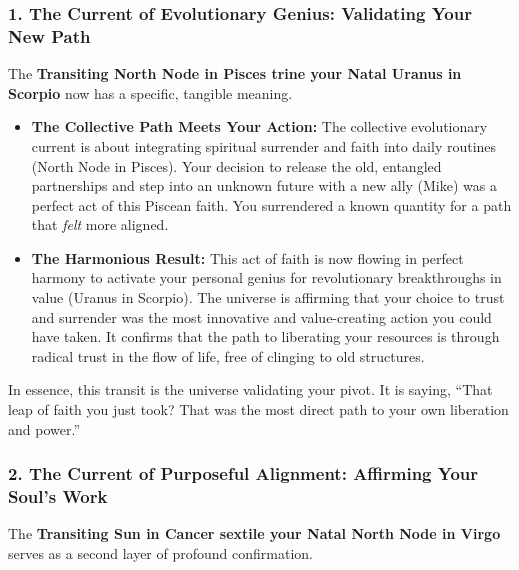 \documentclass{article}
\begin{document}
\subsubsection*{1. The Current of Evolutionary Genius: Validating Your
New
Path}\label{the-current-of-evolutionary-genius-validating-your-new-path}

The \textbf{Transiting North Node in Pisces trine your Natal Uranus in
Scorpio} now has a specific, tangible meaning.

\begin{itemize}
\item
  \textbf{The Collective Path Meets Your Action:} The collective
  evolutionary current is about integrating spiritual surrender and
  faith into daily routines (North Node in Pisces). Your decision to
  release the old, entangled partnerships and step into an unknown
  future with a new ally (Mike) was a perfect act of this Piscean faith.
  You surrendered a known quantity for a path that \emph{felt} more
  aligned.
\item
  \textbf{The Harmonious Result:} This act of faith is now flowing in
  perfect harmony to activate your personal genius for revolutionary
  breakthroughs in value (Uranus in Scorpio). The universe is affirming
  that your choice to trust and surrender was the most innovative and
  value-creating action you could have taken. It confirms that the path
  to liberating your resources is through radical trust in the flow of
  life, free of clinging to old structures.
\end{itemize}

In essence, this transit is the universe validating your pivot. It is
saying, ``That leap of faith you just took? That was the most direct
path to your own liberation and power.''

\subsubsection*{2. The Current of Purposeful Alignment: Affirming Your
Soul's
Work}\label{the-current-of-purposeful-alignment-affirming-your-souls-work}

The \textbf{Transiting Sun in Cancer sextile your Natal North Node in
Virgo} serves as a second layer of profound confirmation.
\end{document}
